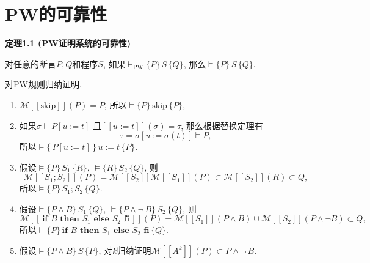 \documentclass[UTF8]{ctexart}
\begin{document}
\setlength{\abovedisplayskip}{1pt}
\setlength{\belowdisplayskip}{1pt}

\section{PW的可靠性}

\hypertarget{sec:定理1.1}{}
\noindent\textbf{定理1.1 (PW证明系统的可靠性)}

对任意的断言$P,Q$和程序$S$, 如果$\vdash_{\mathrm{PW}}\{P\}\,S\,\{Q\}$,
那么$\models\{P\}\,S\,\{Q\}$.


对PW规则归纳证明.

\begin{enumerate}
    \item $\mathcal{M}[\![\mathrm{skip}]\!](P)=P$, 所以$\models
    \{P\}\,\mathrm{skip}\,\{P\}$,

    \item 如果$\sigma\models P[u:=t]$
    且$[\![u:=t]\!](\sigma)=\tau$, 那么根据替换定理有
    \[
        \tau=\sigma[u:=\sigma(t)]\models P,
    \]
    所以$\models\{\,P[u:=t]\,\}\,u:=t\,\{P\}$.

    \item 假设$\models\{P\}\,S_1\,\{R\}$, $\models\{R\}\,S_2\,\{Q\}$, 则
    \[
        \mathcal{M}[\![S_1;S_2]\!](P)=\mathcal{M}[\![S_2]\!]
        \mathcal{M}[\![S_1]\!](P)\subset\mathcal{M}[\![S_2]\!](R)\subset Q,
    \]
    所以$\models\{P\}\,S_1;S_2\,\{Q\}$.

    \item 假设$\models\{P\land B\}\,S_1\,\{Q\}$,
    $\models\{P\land\neg\,B\}\,S_2\,\{Q\}$, 则
    \[
        \mathcal{M}[\![\,\mathbf{if}\,\,B\,\,\mathbf{then}\,\,S_1\,\,
        \mathbf{else}\,\,S_2\,\,\mathbf{fi}\,]\!](P)=
        \mathcal{M}[\![S_1]\!](P\land B)\cup
        \mathcal{M}[\![S_2]\!](P\land\neg B)\subset Q,
    \]
    所以$\models\{P\}\,\mathbf{if}\,\,B\,\,\mathbf{then}\,\,S_1\,\,
    \mathbf{else}\,\,S_2\,\,\mathbf{fi}\,\{Q\}$.

    \item 假设$\models\{P\land B\}\,S\,\{P\}$,
    对$k$归纳证明$\mathcal{M}[\![A^k]\!](P)\subset P\land\neg\,B$.


\end{enumerate}
\end{document}

